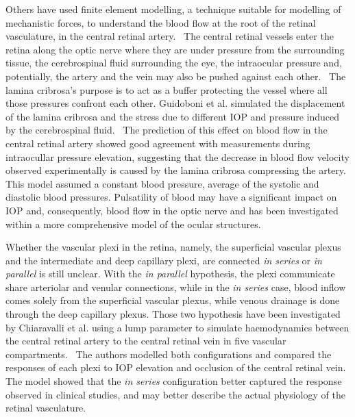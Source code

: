 \documentclass[12pt,a4paper]{journal}
\begin{document}
Others have used finite element modelling, a technique suitable for modelling of mechanistic forces, to understand the blood flow at the root of the retinal vasculature, in the central retinal artery.~\cite{Guidoboni_2014,Jin_2020}
The central retinal vessels enter the retina along the optic nerve where they are under pressure from the surrounding tissue, the cerebrospinal fluid surrounding the eye, the intraocular pressure and, potentially, the artery and the vein may also be pushed against each other.~\cite{Nickells_2012}
The lamina cribrosa's purpose is to act as a buffer protecting the vessel where all those pressures confront each other.
Guidoboni et al. simulated the displacement of the lamina cribrosa and the stress due to different IOP and pressure induced by the cerebrospinal fluid.~\cite{Guidoboni_2014}
The prediction of this effect on blood flow in the central retinal artery showed good agreement with measurements during intraocullar pressure elevation, suggesting that the decrease in blood flow velocity observed experimentally is caused by the lamina cribrosa compressing the artery.
This model assumed a constant blood pressure, average of the systolic and diastolic blood pressures.
Pulsatility of blood may have a significant impact on IOP and, consequently, blood flow in the optic nerve and has been investigated within a more comprehensive model of the ocular structures.~\cite{Jin_2020}


Whether the vascular plexi in the retina, namely, the superficial vascular plexus and the intermediate and deep capillary plexi, are connected \textit{in series} or \textit{in parallel} is still unclear.
With the \textit{in parallel} hypothesis, the plexi communicate share arteriolar and venular connections, while in the \textit{in series} case, blood inflow comes solely from the superficial vascular plexus, while venous drainage is done through the deep capillary plexus.
Those two hypothesis have been investigated by Chiaravalli et al. using a lump parameter to simulate haemodynamics between the central retinal artery to the central retinal vein in five vascular compartments.~\cite{Chiaravalli_2021}
The authors modelled both configurations and compared the responses of each plexi to IOP elevation and occlusion of the central retinal vein.
The model showed that the \textit{in series} configuration better captured the response observed in clinical studies, and may better describe the actual physiology of the retinal vasculature.
\end{document}
